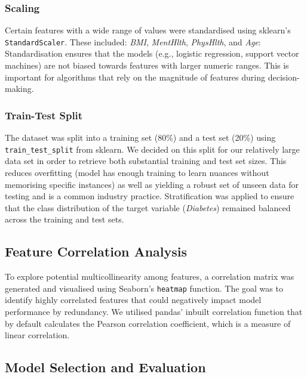 \documentclass[a4paper,12pt]{article}
\begin{document}
\subsubsection{Scaling}
Certain features with a wide range of values were standardised using sklearn's \texttt{StandardScaler}. These included:
\textit{BMI}, \textit{MentHlth}, \textit{PhysHlth}, and \textit{Age}: Standardisation ensures that the models 
(e.g., logistic regression, support vector machines) are not biased towards features with larger 
numeric ranges. This is important for algorithms that rely on the magnitude of features during 
decision-making.

\subsubsection{Train-Test Split}
The dataset was split into a training set (80\%) and a test set (20\%) using \texttt{train\_test\_split} from 
sklearn. We decided on this split for our relatively large data set in order to retrieve both substantial 
training and test set sizes. This reduces overfitting (model has enough training to learn nuances without 
memorising specific instances) as well as yielding a robust set of unseen data for testing and is a common industry practice. 
Stratification was applied to ensure that the class distribution of the target variable 
(\textit{Diabetes}) remained balanced across the training and test sets.

\subsection{Feature Correlation Analysis}
To explore potential multicollinearity among features, a correlation matrix was generated and
visualised using Seaborn's \texttt{heatmap} function. The goal was to identify highly correlated features 
that could negatively impact model performance by redundancy. We utilised pandas' inbuilt correlation
function that by default calculates the Pearson correlation coefficient, which is a measure of linear correlation.

\subsection{Model Selection and Evaluation}
\end{document}
